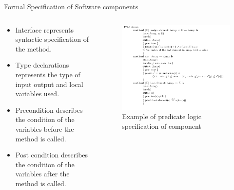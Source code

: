 \documentclass{beamer}
\begin{document}
\begin{frame}{Formal Specification of Software components}
	\begin{columns}
		\begin{column}{0.5\textwidth}
	\begin{itemize}
		\item Interface represents syntactic specification of the method.
		\item Type declarations represents the type of input output and local variables used.
		\item Precondition describes the condition of the variables before the method is called.
		\item Post condition describes the condition of the variables after the method is called.
	\end{itemize}
\end{column}
\begin{column}{0.5\textwidth}
	\begin{figure}
		\includegraphics[scale=0.2]{example_formal.png}
		\caption{Example of predicate logic specification of component\cite{formal}}
		
	\end{figure}
\end{column}
	\end{columns}
\end{frame}
\end{document}
